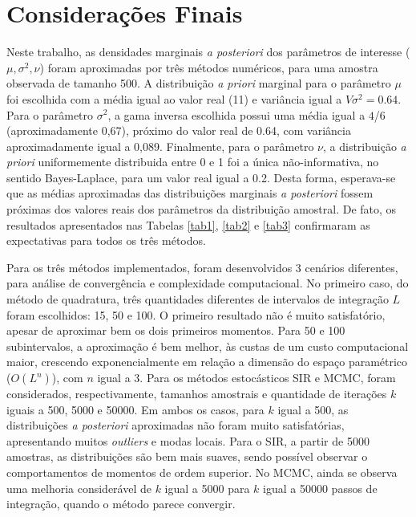 \section{Considerações Finais}\label{consfin}


Neste trabalho, as densidades marginais \textit{a posteriori} dos parâmetros de interesse ($\mu, \sigma^2, \nu$) foram aproximadas por três métodos numéricos, para uma amostra observada de tamanho 500. A distribuição \textit{a priori} marginal para o parâmetro $\mu$ foi escolhida com a média igual ao valor real (11) e variância igual a $V\sigma^2 = 0.64$. Para o parâmetro $\sigma^2$, a gama inversa escolhida possui uma média igual a $4$/$6$ (aproximadamente 0,67), próximo do valor real de 0.64, com variância aproximadamente igual a 0,089. Finalmente, para o parâmetro $\nu$, a distribuição \textit{a priori} uniformemente distribuida entre 0 e 1 foi a única não-informativa, no sentido Bayes-Laplace, para um valor real igual a 0.2. Desta forma, esperava-se que as médias aproximadas das distribuições marginais \textit{a posteriori} fossem próximas dos valores reais dos parâmetros da distribuição amostral. De fato, os resultados apresentados nas Tabelas \ref{tab1}, \ref{tab2} e \ref{tab3} confirmaram as expectativas para todos os três métodos.

Para os três métodos implementados, foram desenvolvidos 3 cenários diferentes, para análise de convergência e complexidade computacional. No primeiro caso, do método de quadratura, três quantidades diferentes de intervalos de integração $L$ foram escolhidos: 15, 50 e 100. O primeiro resultado não é muito satisfatório, apesar de aproximar bem os dois primeiros momentos. Para 50 e 100 subintervalos, a aproximação é bem melhor, às custas de um custo computacional maior, crescendo exponencialmente em relação a dimensão do espaço paramétrico ($O(L^n)$), com $n$ igual a 3. Para os métodos estocásticos SIR e MCMC, foram considerados, respectivamente, tamanhos amostrais e quantidade de iterações $k$ iguais a 500, 5000 e 50000. Em ambos os casos, para $k$ igual a 500, as distribuições \textit{a posteriori} aproximadas não foram muito satisfatórias, apresentando muitos \textit{outliers} e modas locais. Para o SIR, a partir de 5000 amostras, as distribuições são bem mais suaves, sendo possível observar o comportamentos de momentos de ordem superior. No MCMC, ainda se observa uma melhoria considerável de $k$ igual a 5000 para $k$ igual a 50000 passos de integração, quando o método parece convergir.

